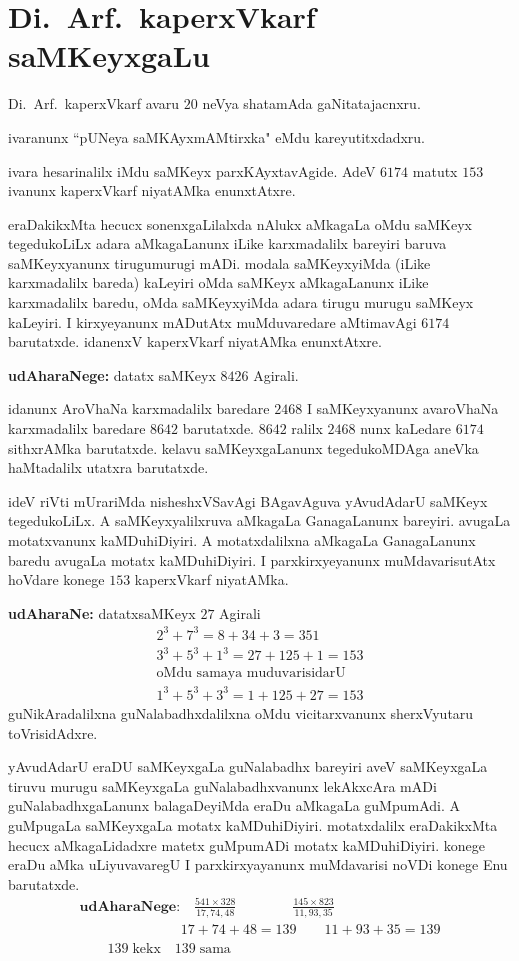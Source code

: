 \chapter{Di.~Arf.\ kaperxVkarf saMKeyxgaLu}

Di.~Arf.\ kaperxVkarf avaru $20$\; neVya shatamAda gaNitatajacnxru.

ivaranunx ``pUNeya saMKAyxmAMtirxka" eMdu kareyutitxdadxru.

ivara hesarinalilx iMdu saMKeyx parxKAyxtavAgide. AdeV $6174$ matutx $153$ ivanunx kaperxVkarf niyatAMka enunxtAtxre.

eraDakikxMta hecucx sonenxgaLilalxda nAlukx aMkagaLa oMdu saMKeyx tegedukoLiLx adara aMkagaLanunx iLike karxmadalilx bareyiri baruva saMKeyxyanunx tirugumurugi mADi. modala saMKeyxyiMda (iLike karxmadalilx bareda) kaLeyiri oMda saMKeyx aMkagaLanunx iLike karxmadalilx baredu, oMda saMKeyxyiMda adara tirugu murugu saMKeyx kaLeyiri. I kirxyeyanunx mADutAtx muMduvaredare aMtimavAgi $6174$ barutatxde. idanenxV kaperxVkarf niyatAMka enunxtAtxre.

\textbf{udAharaNege:} datatx saMKeyx $8426$ Agirali.

idanunx AroVhaNa karxmadalilx baredare $2468$ I saMKeyxyanunx avaroVhaNa karxmadalilx baredare $8642$ barutatxde. $8642$\; ralilx $2468$ nunx kaLedare $6174$ sithxrAMka barutatxde. kelavu saMKeyxgaLanunx tegedukoMDAga aneVka haMtadalilx utatxra barutatxde.

ideV riVti mUrariMda nisheshxVSavAgi BAgavAguva yAvudAdarU saMKeyx tegedu\-koLiLx. A saMKeyxyalilxruva aMkagaLa GanagaLanunx bareyiri. avugaLa motatxvanunx kaMDu\-hiDiyiri. A motatxdalilxna aMkagaLa GanagaLanunx baredu avugaLa motatx kaMDu\-hiDiyiri. I parxkirxyeyanunx muMdavarisutAtx hoVdare konege $153$ kaperxVkarf niyatAMka. 

\textbf{udAharaNe:} datatxsaMKeyx $27$ Agirali
\begin{gather*}
2^3+7^3 = 8+34+3 = 351\\
3^3+5^3+1^3 = 27+125+1 = 153\\
\text{oMdu samaya muduvarisidarU}\\
1^3+5^3+3^3 = 1+125+27 = 153
\end{gather*}
guNikAradalilxna guNalabadhxdalilxna oMdu vicitarxvanunx sherxVyutaru toVrisidAdxre.

yAvudAdarU eraDU saMKeyxgaLa guNalabadhx bareyiri aveV saMKeyxgaLa tiruvu murugu saMKeyxgaLa guNalabadhxvanunx lekAkxcAra mADi guNalabadhxgaLanunx balagaDeyiMda eraDu aMkagaLa guMpumAdi. A guMpugaLa saMKeyxgaLa motatx kaMDuhiDiyiri. motatxdalilx eraDakikxMta hecucx aMkagaLidadxre matetx guMpumADi motatx kaMDuhiDiyiri. konege eraDu aMka uLiyuvavaregU I parxkirxyayanunx muMdavarisi noVDi konege Enu barutatxde.
\begin{gather*}
\textbf{udAharaNege:}\quad \frac{541\times 328}{17,74,48} \qquad\qquad \frac{145 \times 823}{11,93,35}\\
\phantom{\text{udAharaNege:}}\quad 17+74+48 = 139 \qquad 11+93+35 = 139\\
\qquad 139\;\text{kekx} \quad 139\; \text{sama}
\end{gather*}
